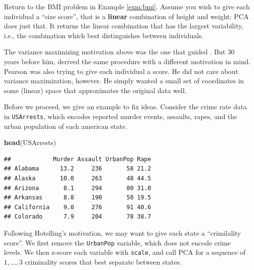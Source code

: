 \documentclass[]{book}
\newenvironment{Shaded}{\begin{snugshade}}{\end{snugshade}}
\newcommand{\KeywordTok}[1]{\textcolor[rgb]{0.13,0.29,0.53}{\textbf{#1}}}
\newcommand{\DataTypeTok}[1]{\textcolor[rgb]{0.13,0.29,0.53}{#1}}
\newcommand{\DecValTok}[1]{\textcolor[rgb]{0.00,0.00,0.81}{#1}}
\newcommand{\StringTok}[1]{\textcolor[rgb]{0.31,0.60,0.02}{#1}}
\newcommand{\OtherTok}[1]{\textcolor[rgb]{0.56,0.35,0.01}{#1}}
\newcommand{\OperatorTok}[1]{\textcolor[rgb]{0.81,0.36,0.00}{\textbf{#1}}}
\newcommand{\NormalTok}[1]{#1}
\theoremstyle{definition}
\theoremstyle{definition}
\theoremstyle{definition}
\theoremstyle{remark}
\begin{document}
Return to the BMI problem in Example \ref{exm:bmi}. Assume you wish to
give each individual a ``size score'', that is a \textbf{linear}
combination of height and weight: PCA does just that. It returns the
linear combination that has the largest variability, i.e., the
combination which best distinguishes between individuals.

The variance maximizing motivation above was the one that guided
\citet{hotelling1933analysis}. But \(30\) years before him,
\citet{pearson1901liii} derived the same procedure with a different
motivation in mind. Pearson was also trying to give each individual a
score. He did not care about variance maximization, however. He simply
wanted a small set of coordinates in some (linear) space that
approximates the original data well.

Before we proceed, we give an example to fix ideas. Consider the crime
rate data in \texttt{USArrests}, which encodes reported murder events,
assaults, rapes, and the urban population of each american state.

\begin{Shaded}
\begin{Highlighting}[]
\KeywordTok{head}\NormalTok{(USArrests)}
\end{Highlighting}
\end{Shaded}

\begin{verbatim}
##            Murder Assault UrbanPop Rape
## Alabama      13.2     236       58 21.2
## Alaska       10.0     263       48 44.5
## Arizona       8.1     294       80 31.0
## Arkansas      8.8     190       50 19.5
## California    9.0     276       91 40.6
## Colorado      7.9     204       78 38.7
\end{verbatim}

Following Hotelling's motivation, we may want to give each state a
``crimilality score''. We first remove the \texttt{UrbanPop} variable,
which does not encode crime levels. We then z-score each variable with
\texttt{scale}, and call PCA for a sequence of \(1,\dots,3\) criminality
scores that best separate between states.

\begin{Shaded}
\end{Shaded}
\end{document}
